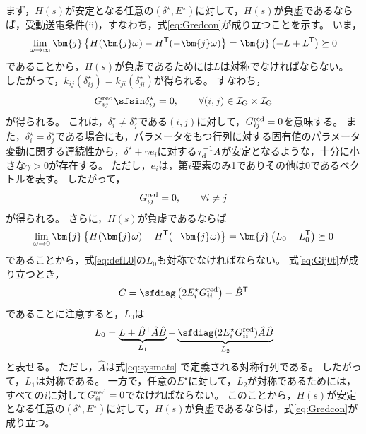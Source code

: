 \documentclass[tombow,dvipdfmx]{corona-a5-1.1}
\begin{document}
\begin{証明}
まず，$H(s)$が安定となる任意の$(\delta^{\star},E^{\star})$に対して，$H(s)$が負虚であるならば，受動送電条件(ii)，すなわち，式\ref{eq:Gredcon}が成り立つことを示す。
いま，
\[
\lim_{\omega \rightarrow \infty} \bm{j}
\left\{
H(\bm{j}\omega)-H^{\sf T}(-\bm{j}\omega)
\right\}
=\bm{j}
\left(
-L+L^{\sf T}
\right) \succeq 0
\]
であることから，$H(s)$が負虚であるためには$L$は対称でなければならない。
したがって，$k_{ij}(\delta_{ij}^{\star}) = k_{ji}(\delta_{ji}^{\star})$が得られる。
すなわち，
\[
G^{\rm red}_{ij} \sfsin \delta_{ij}^{\star} = 0 ,\qquad
\forall (i, j) \in \mathcal{I}_{\rm G} \times \mathcal{I}_{\rm G}
\]
が得られる。
これは，$\delta_{i}^{\star}\neq \delta_{j}^{\star}$である$(i,j)$に対して，$G^{\rm red}_{ij}=0$を意味する。
また，$\delta_{i}^{\star}= \delta_{j}^{\star}$である場合にも，パラメータをもつ行列に対する固有値のパラメータ変動に関する連続性から，$\delta^{\star}+\gamma e_i$に対する$\tau_{\rm d}^{-1}A$が安定となるような，十分に小さな$\gamma>0$が存在する。
ただし，$e_i$は，第$i$要素のみ1でありその他は0であるベクトルを表す。
したがって，
\begin{align}\label{eq:Gij0t}
G^{\rm red}_{ij}=0, \qquad
\forall i\neq j
\end{align}
が得られる。
さらに，$H(s)$が負虚であるならば
\[
\lim_{\omega \rightarrow 0} \bm{j}
\left\{
H(\bm{j}\omega)-H^{\sf T}(-\bm{j}\omega)
\right\}
=\bm{j}
\left(
L_0-L_0^{\sf T}
\right) \succeq 0
\]
であることから，式\ref{eq:defL0}の$L_0$も対称でなければならない。
式\ref{eq:Gij0t}が成り立つとき，
\[
C = \sfdiag \left(
2E_i^{\star} G^{\rm red}_{ii}
\right)  - \hat{B}^{\sf T}
\]
であることに注意すると，$L_0$は
\[
L_0 = \underbrace{ L + \hat{B}^{\sf T} \hat{A} \hat{B} }_{L_1}
-
\underbrace{ \sfdiag (
2 E_i^{\star} G^{\rm red}_{ii}
) \hat{A} \hat{B}
}_{L_2}
\]
と表せる。
ただし，$\hat{A}$は式\ref{eq:sysmats}
で定義される対称行列である。
したがって，$L_1$は対称である。
一方で，任意の$E^{\star}$に対して，$L_2$が対称であるためには，すべての$i$に対して$G^{\rm red}_{ii}=0$でなければならない。
このことから，$H(s)$が安定となる任意の$(\delta^{\star},E^{\star})$に対して，$H(s)$が負虚であるならば，式\ref{eq:Gredcon}が成り立つ。



\end{証明}
\end{document}
